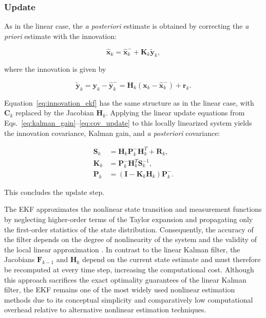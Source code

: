\subsubsection{Update}

As in the linear case, the \emph{a posteriori} estimate is obtained by correcting the \emph{a priori} estimate with the innovation:

\begin{equation}
	\hat{\bm{x}}_k = \hat{\bm{x}}_k^- + \bm{K}_k \tilde{\bm{y}}_k, 
	\label{eq:ekf_state_update}
\end{equation}

where the innovation is given by

\begin{equation}
	\tilde{\bm{y}}_k 
	= 
	\bm{y}_k - \hat{\bm{y}}_k^-
	=
	\bm{H}_k(\bm{x}_k-\hat{\bm{x}}_k^-) + \bm{r}_k.
	\label{eq:innovation_ekf}
\end{equation}

Equation~\eqref{eq:innovation_ekf} has the same structure as in the linear case, with $\bm{C}_k$ replaced by the Jacobian $\bm{H}_k$. Applying the linear update equations from Eqs.~\eqref{eq:kalman_gain}--\eqref{eq:cov_update} to this locally linearized system yields the innovation covariance, Kalman gain, and \emph{a posteriori} covariance:

\begin{align}
	\bm{S}_k &= \bm{H}_k \bm{P}_k^- \bm{H}_k^T + \bm{R}_k,
	\label{eq:ekf_innovation_cov}
	\\[4pt]
	\bm{K}_k &= \bm{P}_k^- \bm{H}_k^T \bm{S}_k^{-1},
	\label{eq:ekf_kalman_gain}
	\\[4pt]
	\bm{P}_k &= (\bm{I} - \bm{K}_k \bm{H}_k)\bm{P}_k^-.
	\label{eq:ekf_cov_update}
\end{align}

This concludes the update step. 

The EKF approximates the nonlinear state transition and measurement functions by neglecting higher-order terms of the Taylor expansion and propagating only the first-order statistics of the state distribution. Consequently, the accuracy of the filter depends on the degree of nonlinearity of the system and the validity of the local linear approximation \cite{Simon2006}. In contrast to the linear Kalman filter, the Jacobians $\bm{F}_{k-1}$ and $\bm{H}_k$ depend on the current state estimate and must therefore be recomputed at every time step, increasing the computational cost. Although this approach sacrifices the exact optimality guarantees of the linear Kalman filter, the EKF remains one of the most widely used nonlinear estimation methods due to its conceptual simplicity and comparatively low computational overhead relative to alternative nonlinear estimation techniques.





